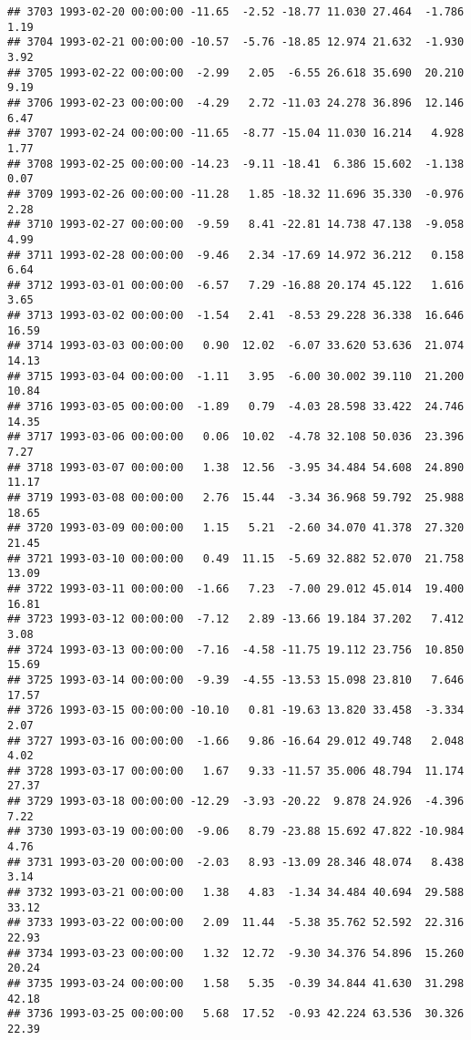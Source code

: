 \documentclass{article}\usepackage{graphicx, color}
\makeatletter
\newenvironment{kframe}{%
 \def\at@end@of@kframe{}%
 \ifinner\ifhmode%
  \def\at@end@of@kframe{\end{minipage}}%
  \begin{minipage}{\columnwidth}%
 \fi\fi%
 \def\FrameCommand##1{\hskip\@totalleftmargin \hskip-\fboxsep
 \colorbox{shadecolor}{##1}\hskip-\fboxsep
     \hskip-\linewidth \hskip-\@totalleftmargin \hskip\columnwidth}%
 \MakeFramed {\advance\hsize-\width
   \@totalleftmargin\z@ \linewidth\hsize
   \@setminipage}}%
 {\par\unskip\endMakeFramed%
 \at@end@of@kframe}
\newenvironment{knitrout}{}{} %
\makeatother
\begin{document}
\begin{knitrout}
\begin{kframe}
\begin{verbatim}
## 3703 1993-02-20 00:00:00 -11.65  -2.52 -18.77 11.030 27.464  -1.786   1.19
## 3704 1993-02-21 00:00:00 -10.57  -5.76 -18.85 12.974 21.632  -1.930   3.92
## 3705 1993-02-22 00:00:00  -2.99   2.05  -6.55 26.618 35.690  20.210   9.19
## 3706 1993-02-23 00:00:00  -4.29   2.72 -11.03 24.278 36.896  12.146   6.47
## 3707 1993-02-24 00:00:00 -11.65  -8.77 -15.04 11.030 16.214   4.928   1.77
## 3708 1993-02-25 00:00:00 -14.23  -9.11 -18.41  6.386 15.602  -1.138   0.07
## 3709 1993-02-26 00:00:00 -11.28   1.85 -18.32 11.696 35.330  -0.976   2.28
## 3710 1993-02-27 00:00:00  -9.59   8.41 -22.81 14.738 47.138  -9.058   4.99
## 3711 1993-02-28 00:00:00  -9.46   2.34 -17.69 14.972 36.212   0.158   6.64
## 3712 1993-03-01 00:00:00  -6.57   7.29 -16.88 20.174 45.122   1.616   3.65
## 3713 1993-03-02 00:00:00  -1.54   2.41  -8.53 29.228 36.338  16.646  16.59
## 3714 1993-03-03 00:00:00   0.90  12.02  -6.07 33.620 53.636  21.074  14.13
## 3715 1993-03-04 00:00:00  -1.11   3.95  -6.00 30.002 39.110  21.200  10.84
## 3716 1993-03-05 00:00:00  -1.89   0.79  -4.03 28.598 33.422  24.746  14.35
## 3717 1993-03-06 00:00:00   0.06  10.02  -4.78 32.108 50.036  23.396   7.27
## 3718 1993-03-07 00:00:00   1.38  12.56  -3.95 34.484 54.608  24.890  11.17
## 3719 1993-03-08 00:00:00   2.76  15.44  -3.34 36.968 59.792  25.988  18.65
## 3720 1993-03-09 00:00:00   1.15   5.21  -2.60 34.070 41.378  27.320  21.45
## 3721 1993-03-10 00:00:00   0.49  11.15  -5.69 32.882 52.070  21.758  13.09
## 3722 1993-03-11 00:00:00  -1.66   7.23  -7.00 29.012 45.014  19.400  16.81
## 3723 1993-03-12 00:00:00  -7.12   2.89 -13.66 19.184 37.202   7.412   3.08
## 3724 1993-03-13 00:00:00  -7.16  -4.58 -11.75 19.112 23.756  10.850  15.69
## 3725 1993-03-14 00:00:00  -9.39  -4.55 -13.53 15.098 23.810   7.646  17.57
## 3726 1993-03-15 00:00:00 -10.10   0.81 -19.63 13.820 33.458  -3.334   2.07
## 3727 1993-03-16 00:00:00  -1.66   9.86 -16.64 29.012 49.748   2.048   4.02
## 3728 1993-03-17 00:00:00   1.67   9.33 -11.57 35.006 48.794  11.174  27.37
## 3729 1993-03-18 00:00:00 -12.29  -3.93 -20.22  9.878 24.926  -4.396   7.22
## 3730 1993-03-19 00:00:00  -9.06   8.79 -23.88 15.692 47.822 -10.984   4.76
## 3731 1993-03-20 00:00:00  -2.03   8.93 -13.09 28.346 48.074   8.438   3.14
## 3732 1993-03-21 00:00:00   1.38   4.83  -1.34 34.484 40.694  29.588  33.12
## 3733 1993-03-22 00:00:00   2.09  11.44  -5.38 35.762 52.592  22.316  22.93
## 3734 1993-03-23 00:00:00   1.32  12.72  -9.30 34.376 54.896  15.260  20.24
## 3735 1993-03-24 00:00:00   1.58   5.35  -0.39 34.844 41.630  31.298  42.18
## 3736 1993-03-25 00:00:00   5.68  17.52  -0.93 42.224 63.536  30.326  22.39

\end{verbatim}
\end{kframe}
\end{knitrout}
\end{document}
